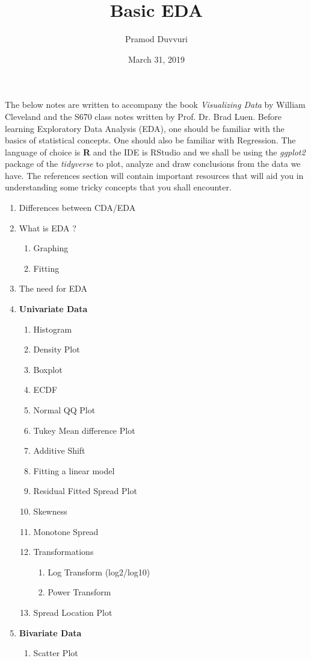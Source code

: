 \documentclass[11pt]{article}
\title{Basic EDA}
\author{Pramod Duvvuri}
\date{March 31, 2019}
\begin{document}
	\maketitle
	The below notes are written to accompany the book \textit{Visualizing Data} by William Cleveland and the S670 class notes written by Prof. Dr. Brad Luen. Before learning Exploratory Data Analysis (EDA), one should be familiar with the basics of statistical concepts. One should also be familiar with Regression. The language of choice is \textbf{R} and the IDE is RStudio and we shall be using the \textit{ggplot2} package of the \textit{tidyverse} to plot, analyze and draw conclusions from the data we have. The references section will contain important resources that will aid you in understanding some tricky concepts that you shall encounter.
	\begin{enumerate}
		\item Differences between CDA/EDA
		\item What is EDA ?
		\begin{enumerate}
			\item Graphing
			\item Fitting
		\end{enumerate}
	    \item The need for EDA
		\item \textbf{Univariate Data}
		\begin{enumerate}
			\item Histogram
			\item Density Plot
			\item Boxplot
			\item ECDF
			\item Normal QQ Plot
			\item Tukey Mean difference Plot
			\item Additive Shift
			\item Fitting a linear model
			\item Residual Fitted Spread Plot
			\item Skewness
			\item Monotone Spread
			\item Transformations
			\begin{enumerate}
				\item Log Transform (log2/log10)
				\item Power Transform
			\end{enumerate}
		\item Spread Location Plot
		\end{enumerate}
	\item \textbf{Bivariate Data}
	\begin{enumerate}
		\item Scatter Plot
	\end{enumerate}
	\end{enumerate}
\newpage
\end{document}
